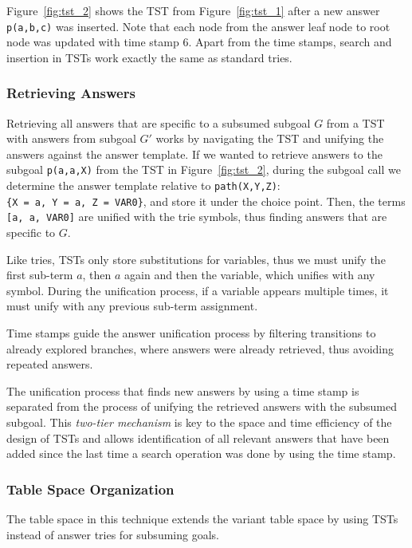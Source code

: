 Figure~\ref{fig:tst_2} shows the TST from Figure~\ref{fig:tst_1} after a new answer \texttt{p(a,b,c)} was inserted.
Note that each node from the answer leaf node to root node was updated with time stamp 6. Apart from
the time stamps, search and insertion in TSTs work exactly the same as standard tries.

\subsubsection{Retrieving Answers}

Retrieving all answers that are specific to a subsumed subgoal $G$ from a TST with answers from subgoal $G'$
works by navigating the TST and unifying the answers against the answer template.
If we wanted to retrieve answers to the subgoal \texttt{p(a,a,X)} from the TST in Figure~\ref{fig:tst_2},
during the subgoal call we determine the answer template relative to \texttt{path(X,Y,Z)}:
\texttt{\{X~=~a,~Y~=~a,~Z~=~VAR0\}},
and store it under the choice point. Then, the terms \texttt{[a,~a,~VAR0]} are unified
with the trie symbols, thus finding answers that are specific to $G$.

Like tries, TSTs only store substitutions for variables, thus we must unify
the first sub-term $a$, then $a$ again and then the variable, which unifies with any symbol.
During the unification process, if a variable appears multiple times, it must unify with
any previous sub-term assignment.

Time stamps guide the answer unification process by filtering transitions to already explored branches, where
answers were already retrieved, thus avoiding repeated answers.

The unification process that finds new answers by using a time stamp is separated from the process
of unifying the retrieved answers with the subsumed subgoal. This \textit{two-tier mechanism} is key to the space and time
efficiency of the design of TSTs \cite{Johnson-99} and allows identification of all relevant answers that have
been added since the last time a search operation was done by using the time stamp.

\subsubsection{Table Space Organization}

The table space in this technique extends the variant table space by
using TSTs instead of answer tries for subsuming goals.
 
